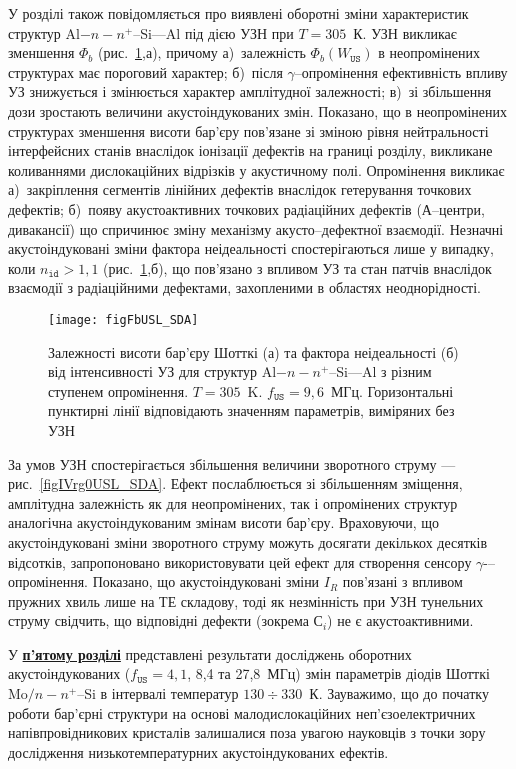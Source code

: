 У розділі також повідомляється про виявлені оборотні зміни характеристик структур Al$-n-n^+$--Si---Al під дією УЗН при $T=305$~К.
УЗН викликає зменшення $\Phi_b$ (рис.~\ref{figFbUSL_SDA},а), причому
а)~залежність $\Phi_b(W_\mathtt{US})$ в неопромінених структурах має пороговий характер;
б)~після $\gamma$--опромінення ефективність впливу УЗ знижується і змінюється характер амплітудної залежності;
в)~зі збільшення дози зростають величини акустоіндукованих змін.
Показано, що в неопромінених структурах зменшення висоти бар'єру пов'язане зі зміною рівня нейтральності інтерфейсних станів
внаслідок іонізації дефектів на границі розділу, викликане коливаннями дислокаційних відрізків у акустичному полі.
Опромінення викликає
а)~закріплення сегментів лінійних дефектів внаслідок гетерування точкових дефектів;
б)~появу акустоактивних точкових радіаційних дефектів (А--центри, дивакансії)
що спричинює зміну механізму акусто--дефектної взаємодії.
Незначні акустоіндуковані зміни фактора неідеальності спостерігаються лише у випадку, коли $n_\mathtt{id}>1,1$ (рис.~\ref{figFbUSL_SDA},б),
що пов'язано з впливом УЗ та стан патчів внаслідок взаємодії з радіаційними дефектами, захопленими в областях неоднорідності.

\begin{figure}
\center
\texttt{[image: figFbUSL\_SDA]}
\caption{\label{figFbUSL_SDA}
Залежності висоти бар'єру Шотткі (а) та фактора неідеальності (б)  від інтенсивності УЗ для
структур Al$-n-n^+$--Si---Al з різним ступенем опромінення.
$T=305$~K.
$f_\mathtt{US}=9,6$~МГц.
Горизонтальні пунктирні лінії відповідають значенням параметрів, виміряних без УЗН
}%
\end{figure}

За умов УЗН спостерігається збільшення величини зворотного струму --- рис.~\ref{figIVrg0USL_SDA}.
Ефект послаблюється зі збільшенням зміщення, амплітудна залежність як для неопромінених, так і опромінених структур аналогічна акустоіндукованим змінам висоти бар'єру.
Враховуючи, що акустоіндуковані зміни зворотного струму можуть досягати декількох десятків відсотків,
запропоновано використовувати цей ефект для створення сенсору $\gamma$-–опромінення.
Показано, що акустоіндуковані зміни $I_R$ пов'язані з впливом пружних хвиль лише на ТЕ складову,
тоді як незмінність при УЗН тунельних струму свідчить, що відповідні дефекти (зокрема С$_i$) не є акустоактивними.


У  \underline{\textbf{п'ятому розділі}} представлені результати досліджень
оборотних акустоіндукованих ($f_\mathtt{US}=4,1$, 8,4 та 27,8~МГц) змін параметрів діодів Шотткі Mo$/n-n^+$--Si в інтервалі температур $130\div330$~К.
Зауважимо, що до початку роботи бар'єрні структури на основі малодислокаційних неп'єзоелектричних напівпровідникових кристалів
залишалися поза увагою науковців з точки зору дослідження низькотемпературних акустоіндукованих ефектів.


